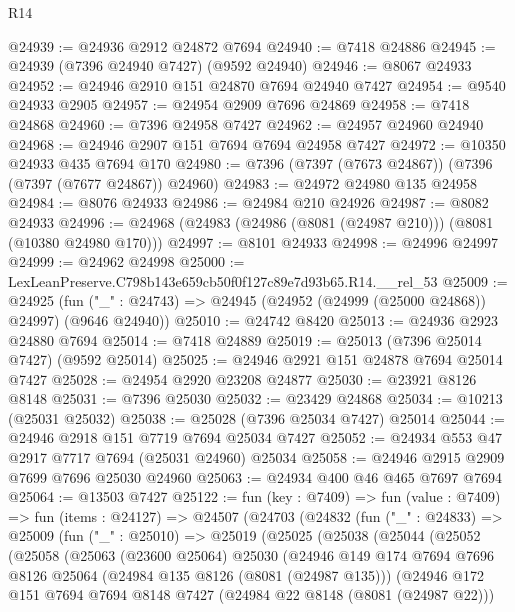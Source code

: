 \begin{lexlean}{R14}
\begin{coremodule}
@24939 := @24936 @2912 @24872 @7694
@24940 := @7418 @24886
@24945 := @24939 (@7396 @24940 @7427) (@9592 @24940)
@24946 := @8067 @24933
@24952 := @24946 @2910 @151 @24870 @7694 @24940 @7427
@24954 := @9540 @24933 @2905
@24957 := @24954 @2909 @7696 @24869
@24958 := @7418 @24868
@24960 := @7396 @24958 @7427
@24962 := @24957 @24960 @24940
@24968 := @24946 @2907 @151 @7694 @7694 @24958 @7427
@24972 := @10350 @24933 @435 @7694 @170
@24980 := @7396 (@7397 (@7673 @24867)) (@7396 (@7397 (@7677 @24867)) @24960)
@24983 := @24972 @24980 @135 @24958
@24984 := @8076 @24933
@24986 := @24984 @210 @24926
@24987 := @8082 @24933
@24996 := @24968 (@24983 (@24986 (@8081 (@24987 @210))) (@8081 (@10380 @24980 @170)))
@24997 := @8101 @24933
@24998 := @24996 @24997
@24999 := @24962 @24998
@25000 := LexLeanPreserve.C798b143e659cb50f0f127c89e7d93b65.R14.__rel_53
@25009 := @24925
    (fun ("_" : @24743) => @24945 (@24952 (@24999 (@25000 @24868)) @24997) (@9646 @24940))
@25010 := @24742 @8420
@25013 := @24936 @2923 @24880 @7694
@25014 := @7418 @24889
@25019 := @25013 (@7396 @25014 @7427) (@9592 @25014)
@25025 := @24946 @2921 @151 @24878 @7694 @25014 @7427
@25028 := @24954 @2920 @23208 @24877
@25030 := @23921 @8126 @8148
@25031 := @7396 @25030
@25032 := @23429 @24868
@25034 := @10213 (@25031 @25032)
@25038 := @25028 (@7396 @25034 @7427) @25014
@25044 := @24946 @2918 @151 @7719 @7694 @25034 @7427
@25052 := @24934 @553 @47 @2917 @7717 @7694 (@25031 @24960) @25034
@25058 := @24946 @2915 @2909 @7699 @7696 @25030 @24960
@25063 := @24934 @400 @46 @465 @7697 @7694
@25064 := @13503 @7427
@25122 := fun (key : @7409) =>
  fun (value : @7409) =>
  fun (items : @24127) =>
  @24507
    (@24703
      (@24832
        (fun ("_" : @24833) =>
        @25009
          (fun ("_" : @25010) =>
          @25019
            (@25025
              (@25038
                (@25044
                  (@25052
                    (@25058
                      (@25063
                        (@23600 @25064)
                        @25030
                        (@24946
                          @149
                          @174
                          @7694
                          @7696
                          @8126
                          @25064
                          (@24984 @135 @8126 (@8081 (@24987 @135)))
                          (@24946
                            @172
                            @151
                            @7694
                            @7694
                            @8148
                            @7427
                            (@24984 @22 @8148 (@8081 (@24987 @22)))

\end{coremodule}
\end{lexlean}
